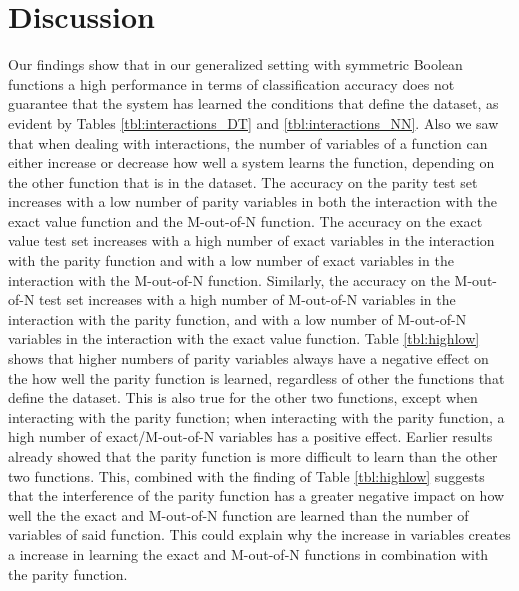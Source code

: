 \documentclass[letterpaper]{article} %
\begin{document}
\section{Discussion}
Our findings show that in our generalized setting with symmetric Boolean functions a high performance in terms of classification accuracy does not guarantee that the system has learned the conditions that define the dataset, as evident by Tables \ref{tbl:interactions_DT} and \ref{tbl:interactions_NN}. Also we saw that when dealing with interactions, the number of variables of a function can either increase or decrease how well a system learns the function, depending on the other function that is in the dataset. The accuracy on the parity test set increases with a low number of parity variables in both the interaction with the exact value function and the M-out-of-N function. The accuracy on the exact value test set increases with a high number of exact variables in the interaction with the parity function and with a low number of exact variables in the interaction with the M-out-of-N function. Similarly, the accuracy on the M-out-of-N test set increases with a high number of M-out-of-N variables in the interaction with the parity function, and with a low number of M-out-of-N variables in the interaction with the exact value function. Table \ref{tbl:highlow}  shows that higher numbers of parity variables always have a negative effect on the how well the parity function is learned, regardless of other the functions that define the dataset. This is also true for the other two functions, except when interacting with the parity function; when interacting with the parity function, a high number of exact/M-out-of-N variables has a positive effect. Earlier results %
already showed that the parity function is more difficult to learn than the other two functions. This, combined with the finding of Table \ref{tbl:highlow} suggests that the interference of the parity function has a greater negative impact on how well the the exact and M-out-of-N function are learned than the number of variables of said function. This could explain why the increase in variables creates a increase in learning the exact and M-out-of-N functions in combination with the parity function. 
\end{document}
